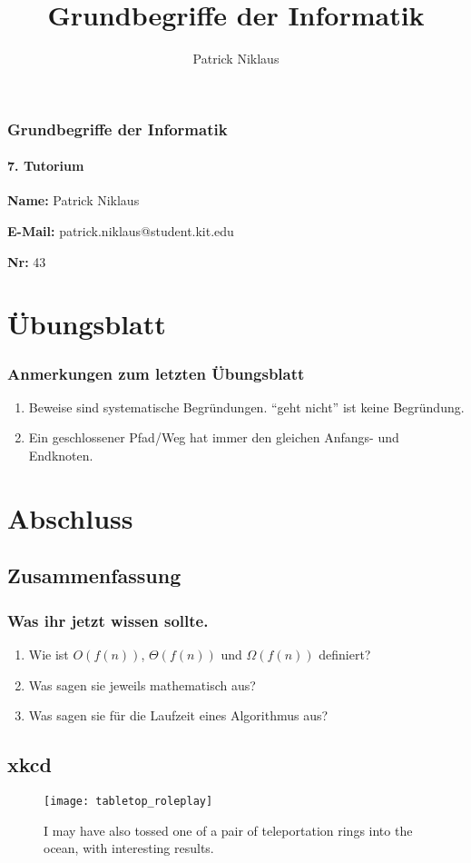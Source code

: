 \documentclass{beamer}
\title{Grundbegriffe der Informatik}
\author{Patrick Niklaus}
\begin{document}
\begin{frame}
  \frametitle{Grundbegriffe der Informatik}
  \framesubtitle{7. Tutorium}
  \begin{description}
    \item \textbf{Name:} Patrick Niklaus
    \item \textbf{E-Mail:} patrick.niklaus@student.kit.edu
    \item \textbf{Nr:} 43
  \end{description}
\end{frame}

\section{Übungsblatt}
\begin{frame}
  \frametitle{Anmerkungen zum letzten Übungsblatt}
  \begin{enumerate}
    \item Beweise sind systematische Begründungen. "`geht nicht"' ist keine Begründung.
    \item Ein geschlossener Pfad/Weg hat immer den gleichen Anfangs- und Endknoten.
  \end{enumerate}
\end{frame}



\section{Abschluss}
\subsection{Zusammenfassung}
\begin{frame}
  \frametitle{Was ihr jetzt wissen sollte.}
  \begin{enumerate}
    \item Wie ist $O(f(n))$, $\Theta(f(n))$ und $\Omega(f(n))$ definiert?
    \item Was sagen sie jeweils mathematisch aus?
    \item Was sagen sie für die Laufzeit eines Algorithmus aus?
  \end{enumerate}
\end{frame}

\subsection{xkcd}
\begin{frame}[plain]
  \begin{figure}
    \begin{center}
      \texttt{[image: tabletop\_roleplay]}
    \end{center}
    {\tiny I may have also tossed one of a pair of teleportation rings into the ocean, with interesting results.}
  \end{figure}
\end{frame}
\end{document}
